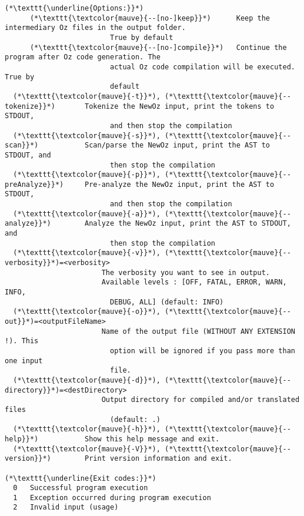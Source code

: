 \begin{lstlisting}[label={lst:compilation-h},title={Output of the command "\texttt{\$ nozc -h}", showing help regarding the usage of the command}]
(*\texttt{\underline{Options:}}*)
      (*\texttt{\textcolor{mauve}{--[no-]keep}}*)      Keep the intermediary Oz files in the output folder.
                         True by default
      (*\texttt{\textcolor{mauve}{--[no-]compile}}*)   Continue the program after Oz code generation. The
                         actual Oz code compilation will be executed. True by
                         default
  (*\texttt{\textcolor{mauve}{-t}}*), (*\texttt{\textcolor{mauve}{--tokenize}}*)       Tokenize the NewOz input, print the tokens to STDOUT,
                         and then stop the compilation
  (*\texttt{\textcolor{mauve}{-s}}*), (*\texttt{\textcolor{mauve}{--scan}}*)           Scan/parse the NewOz input, print the AST to STDOUT, and
                         then stop the compilation
  (*\texttt{\textcolor{mauve}{-p}}*), (*\texttt{\textcolor{mauve}{--preAnalyze}}*)     Pre-analyze the NewOz input, print the AST to STDOUT,
                         and then stop the compilation
  (*\texttt{\textcolor{mauve}{-a}}*), (*\texttt{\textcolor{mauve}{--analyze}}*)        Analyze the NewOz input, print the AST to STDOUT, and
                         then stop the compilation
  (*\texttt{\textcolor{mauve}{-v}}*), (*\texttt{\textcolor{mauve}{--verbosity}}*)=<verbosity>
                       The verbosity you want to see in output.
                       Available levels : [OFF, FATAL, ERROR, WARN, INFO,
                         DEBUG, ALL] (default: INFO)
  (*\texttt{\textcolor{mauve}{-o}}*), (*\texttt{\textcolor{mauve}{--out}}*)=<outputFileName>
                       Name of the output file (WITHOUT ANY EXTENSION !). This
                         option will be ignored if you pass more than one input
                         file.
  (*\texttt{\textcolor{mauve}{-d}}*), (*\texttt{\textcolor{mauve}{--directory}}*)=<destDirectory>
                       Output directory for compiled and/or translated files
                         (default: .)
  (*\texttt{\textcolor{mauve}{-h}}*), (*\texttt{\textcolor{mauve}{--help}}*)           Show this help message and exit.
  (*\texttt{\textcolor{mauve}{-V}}*), (*\texttt{\textcolor{mauve}{--version}}*)        Print version information and exit.

(*\texttt{\underline{Exit codes:}}*)
  0   Successful program execution
  1   Exception occurred during program execution
  2   Invalid input (usage)
\end{lstlisting}
